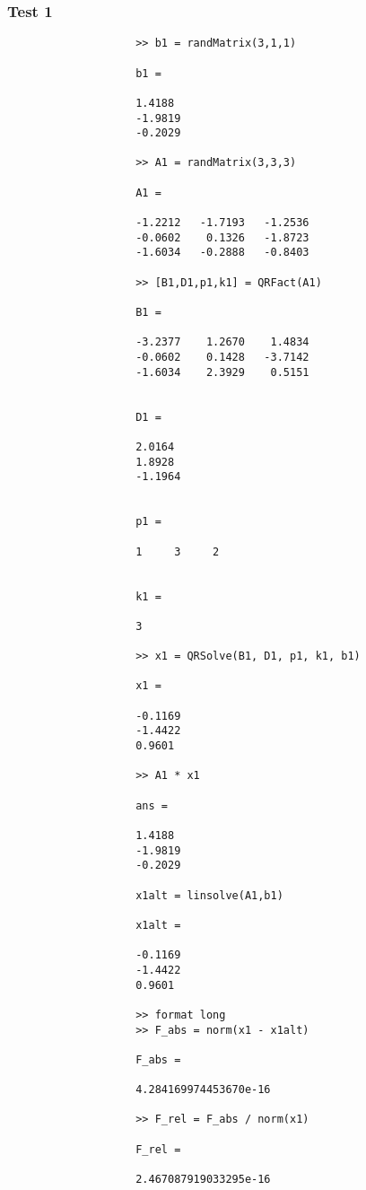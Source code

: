 \documentclass[11pt,titlepage]{article}
\begin{document}
			\subsubsection{Test 1}
				\begin{lstlisting}
					>> b1 = randMatrix(3,1,1)
					
					b1 =
					
					1.4188
					-1.9819
					-0.2029
					
					>> A1 = randMatrix(3,3,3)
					
					A1 =
					
					-1.2212   -1.7193   -1.2536
					-0.0602    0.1326   -1.8723
					-1.6034   -0.2888   -0.8403
					
					>> [B1,D1,p1,k1] = QRFact(A1)
					
					B1 =
					
					-3.2377    1.2670    1.4834
					-0.0602    0.1428   -3.7142
					-1.6034    2.3929    0.5151
					
					
					D1 =
					
					2.0164
					1.8928
					-1.1964
					
					
					p1 =
					
					1     3     2
					
					
					k1 =
					
					3
					
					>> x1 = QRSolve(B1, D1, p1, k1, b1)
					
					x1 =
					
					-0.1169
					-1.4422
					0.9601
					
					>> A1 * x1
					
					ans =
					
					1.4188
					-1.9819
					-0.2029
			
					x1alt = linsolve(A1,b1)
					
					x1alt =
					
					-0.1169
					-1.4422
					0.9601
					
					>> format long
					>> F_abs = norm(x1 - x1alt)
					
					F_abs =
					
					4.284169974453670e-16
					
					>> F_rel = F_abs / norm(x1)
					
					F_rel =
					
					2.467087919033295e-16
				
				\end{lstlisting}
\end{document}
